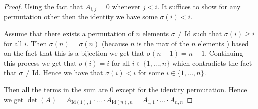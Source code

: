 \documentclass[letter,12pt]{article}
\begin{document}
\begin{proof}
    Using the fact that $A_{i,j}=0$ whenever $j<i$. It suffices to show for any permutation other then the identity we have some $\sigma(i)<i$. 

    Assume that there exists a permutation of $n$ elements $\sigma\not = \text{Id}$ such that $\sigma(i)\geq i$ for all $i$. Then $\sigma(n)=\sigma(n)$ (because $n$ is the max of the $n$ elements ) based on the fact that this is a bijection we get that $\sigma(n-1)=n-1$. Continuing this process we get that $\sigma(i)=i$ for all $i\in \{1,...,n\}$ which contradicts the fact that $\sigma\not = \text{Id}$. Hence we have that $\sigma(i)<i$ for some $i\in \{1,...,n\}$. 
    
    Then all the terms in the sum are $0$ except for the identity permutation. Hence we get $\det(A)=A_{\text{Id}(1),1}\cdot...\cdot A_{\text{Id}(n),n}=A_{1,1}\cdot ... \cdot A_{n,n}$

\end{proof}
\end{document}
